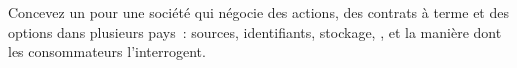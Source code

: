 \begin{interviewq}\label{iq:pl:reference-data-and-symbology-services:5}
Concevez un  pour une société qui négocie des actions, des contrats à terme et des options dans plusieurs pays~: sources, identifiants,
stockage, , et la manière dont les consommateurs l'interrogent.
\end{interviewq}
